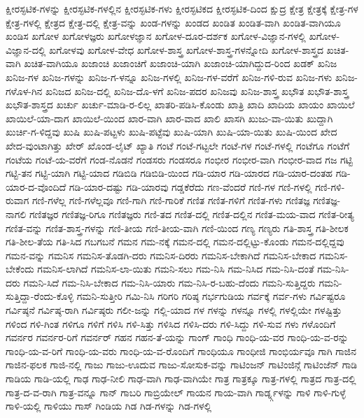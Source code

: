 {ಕ್ಷೀರಸ್ಫಟಿಕ-ಗಳನ್ನು
ಕ್ಷೀರಸ್ಫಟಿಕ-ಗಳಲ್ಲಿನ
ಕ್ಷೀರಸ್ಫಟಿಕ-ಗಳು
ಕ್ಷೀರಸ್ಫಟಿಕದ
ಕ್ಷೀರಸ್ಫಟಿಕ-ದಿಂದ
ಕ್ಷುದ್ರ
ಕ್ಷೇತ್ರ
ಕ್ಷೇತ್ರಕ್ಕೆ
ಕ್ಷೇತ್ರ-ಗಳ
ಕ್ಷೇತ್ರ-ಗಳಲ್ಲಿ
ಕ್ಷೇತ್ರದ
ಕ್ಷೇತ್ರ-ದಲ್ಲಿ
ಕ್ಷೇತ್ರ-ವನ್ನು
ಖಂಡ-ಗಳನ್ನು
ಖಂಡದ
ಖಂಡಿತ
ಖಂಡಿತ-ವಾಗಿ
ಖಂಡಿತ-ವಾಗಿಯೂ
ಖಂಡಿಸ
ಖಗೋಳ
ಖಗೋಳಜ್ಞರು
ಖಗೋಳಜ್ಞಾನ
ಖಗೋಳ-ದೂರ-ದರ್ಶಕ
ಖಗೋಳ-ವಿಜ್ಞಾನ-ಗಳಲ್ಲಿ
ಖಗೋಳ-ವಿಜ್ಞಾನ-ದಲ್ಲಿ
ಖಗೋಳವು
ಖಗೋಳ-ವೇಧ
ಖಗೋಳ-ಶಾಸ್ತ್ರ
ಖಗೋಳ-ಶಾಸ್ತ್ರ-ಗಳನ್ನೋದಿ
ಖಗೋಳ-ಶಾಸ್ತ್ರದ
ಖಚಿತ-ವಾಗಿ
ಖಚಿತ-ವಾಗಿಯೂ
ಖಜಾಂಚಿ
ಖಜಾಂಚಿಗೆ
ಖಜಾಂಚಿ-ಯಾಗಿ
ಖಜಾಂಚಿ-ಯಾಗಿದ್ದುದ-ರಿಂದ
ಖಡಕ್
ಖನಿಜ
ಖನಿಜ-ಗಳ
ಖನಿಜ-ಗಳನ್ನು
ಖನಿಜ-ಗ-ಳನ್ನೂ
ಖನಿಜ-ಗಳಲ್ಲಿ
ಖನಿಜ-ಗಳ-ವರೆಗೆ
ಖನಿಜ-ಗಳಿ-ರುವ
ಖನಿಜ-ಗಳು
ಖನಿಜ-ಗಳೊಳ-ಗಿನ
ಖನಿಜದ
ಖನಿಜ-ದಲ್ಲಿ
ಖನಿಜ-ದೊ-ಳಗೆ
ಖನಿಜ-ಪದರ
ಖನಿಜವು
ಖನಿಜ-ಶಾಸ್ತ್ರ
ಖಭೌತ
ಖಭೌತ-ಶಾಸ್ತ್ರ
ಖಭೌತ-ಶಾಸ್ತ್ರದ
ಖರ್ಚು
ಖರ್ಚು-ಮಾಡಿ-ರ-ಲಿಲ್ಲ
ಖಾತರಿ-ಪಡಿಸಿ-ಕೊಂಡು
ಖಾತ್ರಿ
ಖಾದಿ
ಖಾದಿಯ
ಖಾಯಂ
ಖಾಯಿಲೆ
ಖಾಯಿಲೆ-ಯಾ-ದಾಗ
ಖಾಯಿಲೆ-ಯಿಂದ
ಖಾರ-ವಾಗಿ
ಖಾರ-ವಾದ
ಖಾಲಿ
ಖಾಸಗಿ
ಖುಜು-ವಾ-ಯಿತು
ಖುದ್ದಾಗಿ
ಖುರ್ಚಿ-ಗ-ಳಿದ್ದವು
ಖುಷಿ
ಖುಷಿ-ಪಟ್ಟಳು
ಖುಷಿ-ಪಟ್ಟೆವು
ಖುಷಿ-ಯಾಗಿ
ಖುಷಿ-ಯಾ-ಯಿತು
ಖುಷಿ-ಯಿಂದ
ಖೇದ
ಖೇದ-ವುಂಟಾಗಿತ್ತು
ಖೇರ್
ಖೊಂಡ-ಲೈಟ್
ಖ್ಯಾತಿ
ಗಂಟೆ
ಗಂಟೆ-ಗಟ್ಟಲೇ
ಗಂಟೆ-ಗಳ
ಗಂಟೆ-ಗಳಲ್ಲಿ
ಗಂಟೆಗೂ
ಗಂಟೆಗೆ
ಗಂಟೆಯ
ಗಂಟೆ-ಯ-ವರೆಗೆ
ಗಂಡ-ನೊಡನೆ
ಗಂಡಸರು
ಗಂಡಸರೂ
ಗಂಭೀರ
ಗಂಭೀರ-ವಾಗಿ
ಗಂಭೀರ-ವಾದ
ಗಜ
ಗಟ್ಟಿ
ಗಟ್ಟಿ-ತನ
ಗಟ್ಟಿ-ಯಾಗಿ
ಗಟ್ಟಿ-ಯಾದ
ಗಡಿಬಿಡಿ
ಗಡಿಬಿಡಿ-ಯಿಂದ
ಗಡಿ-ಯಾರ
ಗಡಿ-ಯಾರದ
ಗಡಿ-ಯಾರ-ದಂತಹ
ಗಡಿ-ಯಾರ-ದ-ವೊಂದಿದೆ
ಗಡಿ-ಯಾರ-ದಷ್ಟು
ಗಡಿ-ಯಾರವು
ಗಡ್ಡಕೆರೆದು
ಗಣ-ವೆಂದರೆ
ಗಣಿ-ಗಳ
ಗಣಿ-ಗಳಲ್ಲಿ
ಗಣಿ-ಗಳಿ-ರುವಾಗ
ಗಣಿ-ಗಳೆಲ್ಲ
ಗಣಿ-ಗಳೆಲ್ಲವೂ
ಗಣಿ-ಗಾಗಿ
ಗಣಿ-ಗಾರಿಕೆ
ಗಣಿತ
ಗಣಿತ-ಗಳಿಗೆ
ಗಣಿತ-ಗಳು
ಗಣಿತಜ್ಞ
ಗಣಿತಜ್ಞ-ನಾಗಲಿ
ಗಣಿತಜ್ಞರ
ಗಣಿತಜ್ಞ-ರಿಗೂ
ಗಣಿತಜ್ಞರು
ಗಣಿ-ತದ
ಗಣಿತ-ದಲ್ಲಿ
ಗಣಿತ-ದಲ್ಲಿನ
ಗಣಿತ-ಮಯ-ವಾದ
ಗಣಿತ-ರೀತ್ಯ
ಗಣಿತ-ವನ್ನು
ಗಣಿತ-ಶಾಸ್ತ್ರ-ಗಳನ್ನು
ಗಣಿ-ತೀಯ
ಗಣಿ-ತೀಯ-ವಾಗಿ
ಗಣಿ-ಯಿಂದ
ಗಣ್ಯ
ಗಣ್ಯರು
ಗತಿ-ಶಾಸ್ತ್ರ
ಗತಿ-ಶೀಲಕ
ಗತಿ-ಶೀಲ-ತೆಯ
ಗತಿ-ಸಿದ
ಗಬಗಬನೆ
ಗಮನ
ಗಮ-ನಕ್ಕೆ
ಗಮನ-ದಲ್ಲಿ
ಗಮನ-ದಲ್ಲಿಟ್ಟು-ಕೊಂಡು
ಗಮನ-ದಲ್ಲಿದ್ದವು
ಗಮನ-ವನ್ನು
ಗಮನಿಸ
ಗಮನಿಸ-ತೊಡಗಿ-ದರು
ಗಮನಿಸ-ದಿರರು
ಗಮನಿಸ-ಬೇಕಾಗಿದೆ
ಗಮನಿಸ-ಬೇಕಾದ
ಗಮನಿಸ-ಬೇಕೆಂದು
ಗಮನಿಸ-ಲಾಗಿದೆ
ಗಮನಿಸ-ಲಾ-ಯಿತು
ಗಮನಿ-ಸಲು
ಗಮ-ನಿಸಿ
ಗಮ-ನಿಸಿದ
ಗಮ-ನಿಸಿ-ದಂತೆ
ಗಮ-ನಿಸಿ-ದರು
ಗಮನಿ-ಸಿದೆ
ಗಮ-ನಿಸಿ-ಬೇಕಾದ
ಗಮ-ನಿಸಿ-ಯಾರು
ಗಮ-ನಿಸಿ-ರ-ಬಹು-ದೆಂದು
ಗಮನಿ-ಸುತ್ತಿದ್ದರು
ಗಮನಿ-ಸುತ್ತಿದ್ದಾ-ರೆಂದು-ಕೊಳ್ಳಿ
ಗಮನಿ-ಸುತ್ತೀರಿ
ಗಮಿ-ನಿಸಿ
ಗರಿಗರಿ
ಗರಿಷ್ಠ
ಗರ್ಭಗುಡಿಯ
ಗರ್ವಕ್ಕೆ
ಗರ್ವ-ಗಳು
ಗರ್ವಿಷ್ಟರೂ
ಗರ್ವಿಷ್ಠನೆ
ಗರ್ವಿಷ್ಠ-ರಾಗಿ
ಗರ್ವಿಷ್ಠರು
ಗಲೀ-ಜನ್ನು
ಗಲ್ಲಿ-ಯಾದ
ಗಳ
ಗಳನ್ನು
ಗಳನ್ನೂ
ಗಳಲ್ಲಿ
ಗಳಲ್ಲಿಯೇ
ಗಳಷ್ಟಿತ್ತು
ಗಳಿಂದ
ಗಳಿ-ಗಿಂತ
ಗಳಿಗೂ
ಗಳಿಗೆ
ಗಳಿಸಿ
ಗಳಿ-ಸಿತ್ತು
ಗಳಿಸಿದ
ಗಳಿಸಿ-ದರು
ಗಳಿ-ಸಿದ್ದು
ಗಳಿ-ಸುವ
ಗಳು
ಗಳೊಂದಿಗೆ
ಗವರ್ನರ
ಗವರ್ನರ-ರಿಗೆ
ಗವರ್ನರ್
ಗಹನ
ಗಹನ-ತೆ-ಯನ್ನು
ಗಾಂಗ್
ಗಾಂಧಿ
ಗಾಂಧಿ-ಯ-ವರ
ಗಾಂಧಿ-ಯ-ವ-ರನ್ನು
ಗಾಂಧಿ-ಯ-ವ-ರಿಗೆ
ಗಾಂಧಿ-ಯ-ವರು
ಗಾಂಧಿ-ಯ-ವ-ರೊಂದಿಗೆ
ಗಾಂಧಿಯೂ
ಗಾಂಧೀಜಿ
ಗಾಂಭಿರ್ಯವೂ
ಗಾಗಿ
ಗಾಜಿನ
ಗಾಜಿನ-ಫಲಕ
ಗಾಜಿ-ನಲ್ಲಿ
ಗಾಜು
ಗಾಜು-ಊದುವ
ಗಾಜು-ಸೋಸುಕ-ವನ್ನು
ಗಾಟಿಂಜನ್
ಗಾಟಿಂಜಿನ್ಗೆ
ಗಾಟಿಂಜೆನ್
ಗಾಡಿ
ಗಾಡಿಯ
ಗಾಡಿ-ಯಲ್ಲಿ
ಗಾಢ
ಗಾಢ-ನೀಲಿ
ಗಾಢ-ವಾಗಿ
ಗಾಢ-ವಾಗಿಯೇ
ಗಾತ್ರ
ಗಾತ್ರಕ್ಕೂ
ಗಾತ್ರ-ಗಳಲ್ಲಿ
ಗಾತ್ರದ
ಗಾತ್ರ-ದಲ್ಲಿ
ಗಾತ್ರ-ದ-ವ-ರಾಗಿ
ಗಾತ್ರ-ವನ್ನೂ
ಗಾನ್
ಗಾಬರಿ
ಗಾಬ್ರಿಯೇಲ್
ಗಾಯನ
ಗಾಯ-ವಾಗಿ
ಗಾರ್ಡ್ನ್ಗಳನ್ನು
ಗಾಳಿ
ಗಾಳಿ-ಗುಳ್ಳೆ
ಗಾಳಿ-ಯಲ್ಲಿ
ಗಾಳಿಯು
ಗಾಸ್
ಗಿಂಡಿಯ
ಗಿಡ
ಗಿಡ-ಗಳನ್ನು
ಗಿಡ-ಗಳಲ್ಲಿ
}

